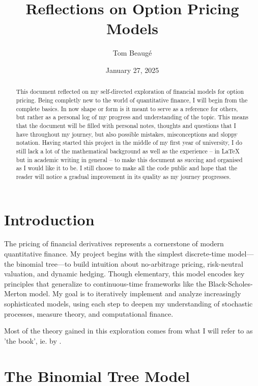 \documentclass{article}
\title{Reflections on Option Pricing Models}
\author{Tom Beaugé}
\date{January 27, 2025}
\begin{document}
    \maketitle

    \begin{abstract}
        This document reflected on my self-directed exploration of financial models for option pricing. Being completly new to the world of quantitative finance, I will begin from the complete basics. In now shape or form is it meant to serve as a reference for others, but rather as a personal log of my progress and understanding of the topic. This means that the document will be filled with personal notes, thoughts and questions that I have throughout my journey, but also possible mistakes, misconceptions and sloppy notation. Having started this project in the middle of my first year of university, I do still lack a lot of the mathematical background as well as the experience -- in LaTeX but in academic writing in general -- to make this document as succing and organised as I would like it to be. I still choose to make all the code public and hope that the reader will notice a gradual improvement in its quality as my journey progresses. 
    \end{abstract}

    \section{Introduction}
    \label{sec:introduction}

    The pricing of financial derivatives represents a cornerstone of modern quantitative finance. My project begins with the simplest discrete-time model---the binomial tree---to build intuition about no-arbitrage pricing, risk-neutral valuation, and dynamic hedging. Though elementary, this model encodes key principles that generalize to continuous-time frameworks like the Black-Scholes-Merton model. My goal is to iteratively implement and analyze increasingly sophisticated models, using each step to deepen my understanding of stochastic processes, measure theory, and computational finance.

    Most of the theory gained in this exploration comes from what I will refer to as 'the book', ie.  by \citeauthor{Wilmott2006}.

    \section{The Binomial Tree Model}
    \label{sec:binomial}
\end{document}
